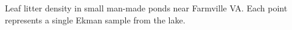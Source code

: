 \label{fig:CPOM_Density} 
Leaf litter density in small man-made ponds near Farmville VA. Each point represents a single Ekman sample from the lake.